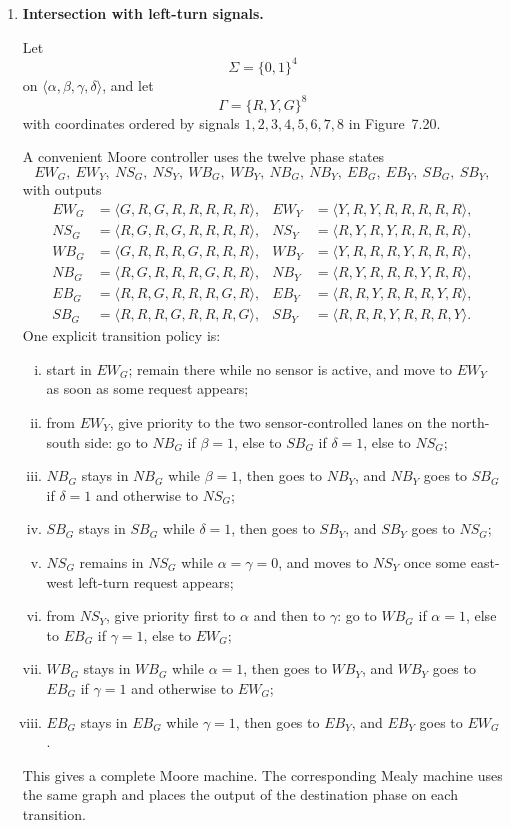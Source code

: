 \begin{enumerate}[{7.}1.]
\item \textbf{Intersection with left-turn signals.}

Let
\[
  \Sigma=\{0,1\}^4
\]
on $\langle \alpha,\beta,\gamma,\delta\rangle$, and let
\[
  \Gamma=\{R,Y,G\}^8
\]
with coordinates ordered by signals $1,2,3,4,5,6,7,8$ in Figure~7.20.

A convenient Moore controller uses the twelve phase states
\[
  EW_G,\ EW_Y,\ NS_G,\ NS_Y,\ WB_G,\ WB_Y,\ NB_G,\ NB_Y,\ EB_G,\ EB_Y,\ SB_G,\ SB_Y,
\]
with outputs
\[
\begin{aligned}
EW_G&=\langle G,R,G,R,R,R,R,R\rangle, &
EW_Y&=\langle Y,R,Y,R,R,R,R,R\rangle,\\
NS_G&=\langle R,G,R,G,R,R,R,R\rangle, &
NS_Y&=\langle R,Y,R,Y,R,R,R,R\rangle,\\
WB_G&=\langle G,R,R,R,G,R,R,R\rangle, &
WB_Y&=\langle Y,R,R,R,Y,R,R,R\rangle,\\
NB_G&=\langle R,G,R,R,R,G,R,R\rangle, &
NB_Y&=\langle R,Y,R,R,R,Y,R,R\rangle,\\
EB_G&=\langle R,R,G,R,R,R,G,R\rangle, &
EB_Y&=\langle R,R,Y,R,R,R,Y,R\rangle,\\
SB_G&=\langle R,R,R,G,R,R,R,G\rangle, &
SB_Y&=\langle R,R,R,Y,R,R,R,Y\rangle.
\end{aligned}
\]
One explicit transition policy is:
\begin{enumerate}[(i)]
  \item start in $EW_G$; remain there while no sensor is active, and move to
  $EW_Y$ as soon as some request appears;
  \item from $EW_Y$, give priority to the two sensor-controlled lanes on the
  north-south side: go to $NB_G$ if $\beta=1$, else to $SB_G$ if $\delta=1$,
  else to $NS_G$;
  \item $NB_G$ stays in $NB_G$ while $\beta=1$, then goes to $NB_Y$, and
  $NB_Y$ goes to $SB_G$ if $\delta=1$ and otherwise to $NS_G$;
  \item $SB_G$ stays in $SB_G$ while $\delta=1$, then goes to $SB_Y$, and
  $SB_Y$ goes to $NS_G$;
  \item $NS_G$ remains in $NS_G$ while $\alpha=\gamma=0$, and moves to $NS_Y$
  once some east-west left-turn request appears;
  \item from $NS_Y$, give priority first to $\alpha$ and then to $\gamma$: go
  to $WB_G$ if $\alpha=1$, else to $EB_G$ if $\gamma=1$, else to $EW_G$;
  \item $WB_G$ stays in $WB_G$ while $\alpha=1$, then goes to $WB_Y$, and
  $WB_Y$ goes to $EB_G$ if $\gamma=1$ and otherwise to $EW_G$;
  \item $EB_G$ stays in $EB_G$ while $\gamma=1$, then goes to $EB_Y$, and
  $EB_Y$ goes to $EW_G$.
\end{enumerate}
This gives a complete Moore machine.  The corresponding Mealy machine uses the
same graph and places the output of the destination phase on each transition.


\end{enumerate}
